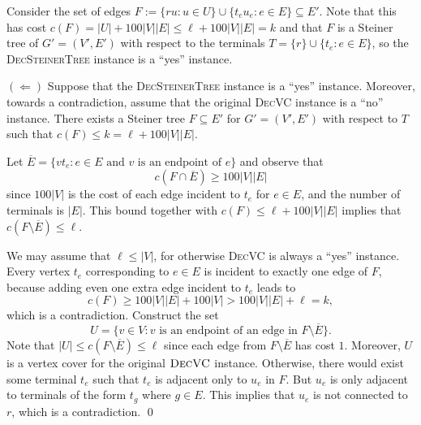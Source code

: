 \begin{pf}
    Consider the set of edges
    $F := \{ru : u \in U\} \cup \{t_e u_e : e \in E\} \subseteq E'$. 
    Note that this has cost 
    $c(F) = |U| + 100|V||E| \leq \ell + 100|V||E| = k$ and that 
    $F$ is a Steiner tree of $G' = (V', E')$ with respect to the 
    terminals $T = \{r\} \cup \{t_e : e \in E\}$, so the \textsc{DecSteinerTree}
    instance is a ``yes'' instance.

    $(\Leftarrow)$ Suppose that the \textsc{DecSteinerTree} instance 
    is a ``yes'' instance. Moreover, towards a contradiction, assume 
    that the original \textsc{DecVC} instance is a ``no'' instance. 
    There exists a Steiner tree $F \subseteq E'$ for $G' = (V', E')$ 
    with respect to $T$ such that $c(F) \leq k = \ell + 100|V||E|$. 

    Let $\overline{E} = \{vt_e : e \in E \text{ and $v$ is an endpoint of $e$}\}$ 
    and observe that 
    \[ c(F \cap \overline{E}) \geq 100|V||E| \] 
    since $100|V|$ is the cost of each edge incident to $t_e$ for $e \in E$, 
    and the number of terminals is $|E|$. This bound together with
    $c(F) \leq \ell + 100|V||E|$ implies that $c(F \setminus \overline{E}) \leq \ell$. 

    We may assume that $\ell \leq |V|$, for otherwise \textsc{DecVC} 
    is always a ``yes'' instance. Every vertex $t_e$ corresponding to $e \in E$ 
    is incident to exactly one edge of $F$, because adding even one 
    extra edge incident to $t_e$ leads to 
    \[ c(F) \geq 100|V||E| + 100|V| > 100|V||E| + \ell = k, \] 
    which is a contradiction. Construct the set 
    \[ U = \{v \in V : v \text{ is an endpoint of an edge in } F \setminus \overline{E}\}. \] 
    Note that $|U| \leq c(F \setminus \overline{E}) \leq \ell$ since 
    each edge from $F \setminus \overline{E}$ has cost $1$. Moreover, 
    $U$ is a vertex cover for the original $\textsc{DecVC}$ instance. 
    Otherwise, there would exist some terminal $t_e$
    such that $t_e$ is adjacent only to $u_e$ in $F$. But $u_e$ 
    is only adjacent to terminals of the form $t_g$ where $g \in E$. 
    This implies that $u_e$ is not connected to $r$, which is a contradiction. \qed
\end{pf}\vspace{-0.25cm}
